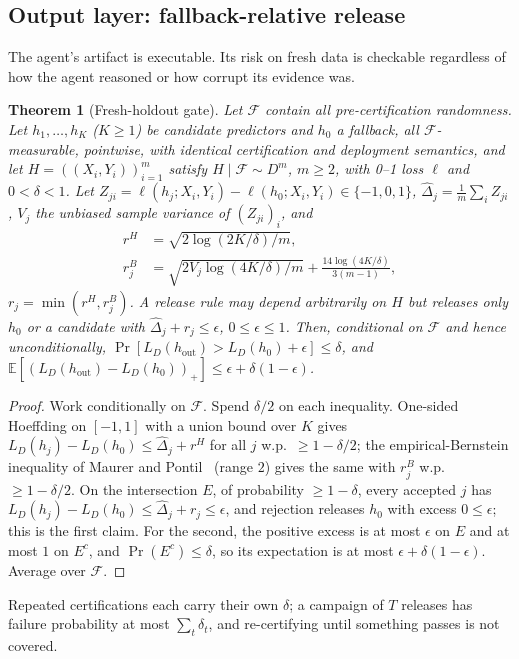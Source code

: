 \documentclass[conference]{IEEEtran}
\newcommand{\risk}[1]{L_D(#1)}
\newtheorem{theorem}{Theorem}
\begin{document}
\subsection{Output layer: fallback-relative release}

The agent's artifact is executable. Its risk on fresh data is
checkable regardless of how the agent reasoned or how corrupt its
evidence was.

\begin{theorem}[Fresh-holdout gate]\label{thm:gate}
Let $\mathcal F$ contain all pre-certification randomness. Let
$h_1,\dots,h_K$ ($K\ge1$) be candidate predictors and $h_0$ a fallback,
all $\mathcal F$-measurable, pointwise, with identical certification
and deployment semantics, and let $H=((X_i,Y_i))_{i=1}^m$ satisfy
$H\mid\mathcal F\sim D^m$, $m\ge2$, with 0--1 loss $\ell$ and
$0<\delta<1$. Let $Z_{ji}=\ell(h_j;X_i,Y_i)-\ell(h_0;X_i,Y_i)\in\{-1,0,1\}$,
$\hat\Delta_j=\frac1m\sum_i Z_{ji}$, $V_j$ the unbiased sample
variance of $(Z_{ji})_i$, and
\begin{align}
r^{H}&=\sqrt{2\log(2K/\delta)/m},\label{eq:hoeff}\\
r^{B}_j&=\sqrt{2V_j\log(4K/\delta)/m}+\tfrac{14\log(4K/\delta)}{3(m-1)},\label{eq:bern}
\end{align}
$r_j=\min(r^H,r^B_j)$. A release rule may depend arbitrarily on $H$ but
releases only $h_0$ or a candidate with $\hat\Delta_j+r_j\le\epsilon$,
$0\le\epsilon\le1$. Then, conditional on $\mathcal F$ and hence
unconditionally,
$\Pr[\risk{h_{\mathrm{out}}}>\risk{h_0}+\epsilon]\le\delta$, and
$\mathbb{E}[(\risk{h_{\mathrm{out}}}-\risk{h_0})_+]\le\epsilon+\delta(1-\epsilon)$.
\end{theorem}
\begin{proof}
Work conditionally on $\mathcal F$. Spend $\delta/2$ on each inequality.
One-sided Hoeffding on $[-1,1]$ with a union bound over $K$ gives
$\risk{h_j}-\risk{h_0}\le\hat\Delta_j+r^H$ for all $j$ w.p.\
$\ge1-\delta/2$; the empirical-Bernstein inequality of Maurer and
Pontil~\cite{maurerpontil2009} (range $2$) gives the same with $r^B_j$
w.p.\ $\ge1-\delta/2$. On the intersection $E$, of probability
$\ge1-\delta$, every accepted $j$ has
$\risk{h_j}-\risk{h_0}\le\hat\Delta_j+r_j\le\epsilon$, and rejection
releases $h_0$ with excess $0\le\epsilon$; this is the first claim. For
the second, the positive excess is at most $\epsilon$ on $E$ and at
most $1$ on $E^c$, and $\Pr(E^c)\le\delta$, so its expectation is at
most $\epsilon+\delta(1-\epsilon)$. Average over $\mathcal F$.
\end{proof}
Repeated certifications each carry their own $\delta$; a campaign of
$T$ releases has failure probability at most $\sum_t\delta_t$, and
re-certifying until something passes is not covered.
\end{document}
